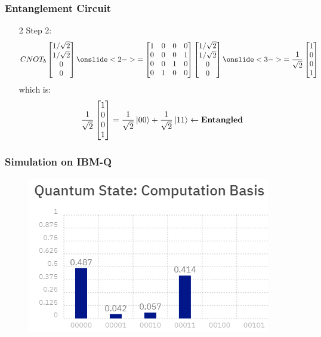 \documentclass{beamer}
\theoremstyle{definition}
\begin{document}
\begin{frame}
\frametitle{Entanglement Circuit}
\begin{itemize}
\item[2] Step 2:\pause
\begin{align*}
CNOT_b \begin{bmatrix}
1/\sqrt{2} \\ 1/\sqrt{2} \\ 0\\0
\end{bmatrix}
\onslide<2->{= 
\begin{bmatrix}
1 & 0 & 0 & 0\\
0 & 0 & 0 & 1\\
0 & 0 & 1 & 0\\
0 & 1 & 0 & 0
\end{bmatrix}
\begin{bmatrix}
1/\sqrt{2} \\ 1/\sqrt{2} \\ 0\\0
\end{bmatrix} 
\onslide<3->{= 
\frac{1}{\sqrt{2}} \begin{bmatrix}
1\\0\\0\\1
\end{bmatrix}}}
\end{align*}
\pause
which is:
\begin{align*}
\frac{1}{\sqrt{2}} \begin{bmatrix}
1\\0\\0\\1
\end{bmatrix} 
= \frac{1}{\sqrt{2}}\left\vert{00}\right\rangle + \frac{1}{\sqrt{2}}\left\vert{11}\right\rangle \leftarrow\textbf{Entangled}
\end{align*}
\end{itemize}
\end{frame}



\begin{frame}
\frametitle{Simulation on IBM-Q}
\begin{figure}[h!]
	\centering
	\includegraphics[scale=0.6]{ibmq1.png}
\end{figure}
\end{frame}
\end{document}

